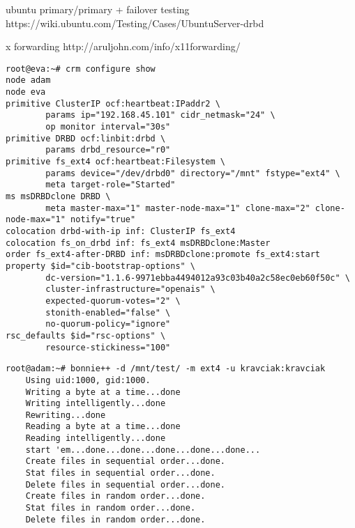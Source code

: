 ubuntu primary/primary + failover testing
https://wiki.ubuntu.com/Testing/Cases/UbuntuServer-drbd

x forwarding
http://aruljohn.com/info/x11forwarding/



\begin{lstlisting}
root@eva:~# crm configure show
node adam
node eva
primitive ClusterIP ocf:heartbeat:IPaddr2 \
        params ip="192.168.45.101" cidr_netmask="24" \
        op monitor interval="30s"
primitive DRBD ocf:linbit:drbd \
        params drbd_resource="r0"
primitive fs_ext4 ocf:heartbeat:Filesystem \
        params device="/dev/drbd0" directory="/mnt" fstype="ext4" \
        meta target-role="Started"
ms msDRBDclone DRBD \
        meta master-max="1" master-node-max="1" clone-max="2" clone-node-max="1" notify="true"
colocation drbd-with-ip inf: ClusterIP fs_ext4
colocation fs_on_drbd inf: fs_ext4 msDRBDclone:Master
order fs_ext4-after-DRBD inf: msDRBDclone:promote fs_ext4:start
property $id="cib-bootstrap-options" \
        dc-version="1.1.6-9971ebba4494012a93c03b40a2c58ec0eb60f50c" \
        cluster-infrastructure="openais" \
        expected-quorum-votes="2" \
        stonith-enabled="false" \
        no-quorum-policy="ignore"
rsc_defaults $id="rsc-options" \
        resource-stickiness="100"
\end{lstlisting}


\begin{lstlisting}
root@adam:~# bonnie++ -d /mnt/test/ -m ext4 -u kravciak:kravciak
	Using uid:1000, gid:1000.
	Writing a byte at a time...done
	Writing intelligently...done
	Rewriting...done
	Reading a byte at a time...done
	Reading intelligently...done
	start 'em...done...done...done...done...done...
	Create files in sequential order...done.
	Stat files in sequential order...done.
	Delete files in sequential order...done.
	Create files in random order...done.
	Stat files in random order...done.
	Delete files in random order...done.
\end{lstlisting}